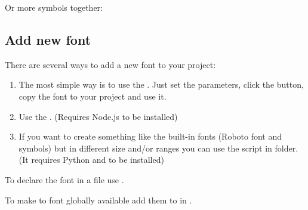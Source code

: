 \documentclass[letterpaper,10pt,english]{sphinxmanual}
\begin{document}
Or more symbols together:

\begin{sphinxVerbatim}[commandchars=\\\{\}]
   
\end{sphinxVerbatim}


\subsection{Add new font}
\label{\detokenize{overview/fonts:add-new-font}}
There are several ways to add a new font to your project:
\begin{enumerate}
\def\theenumi{\arabic{enumi}}
\def\labelenumi{\theenumi .}
\makeatletter\def\p@enumii{\p@enumi \theenumi .}\makeatother
\item {} 
The most simple way is to use the . Just set the parameters, click the  button, copy the font to your project and use it.

\item {} 
Use the . (Requires Node.js to be installed)

\item {} 
If you want to create something like the built-in fonts (Roboto font and symbols) but in different size and/or ranges you can use the  script in  folder.
(It requires Python and  to be installed)

\end{enumerate}

To declare the font in a file use .

To make to font globally available add them to  in .
\end{document}
